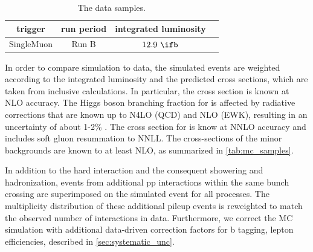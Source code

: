\begin{table}[h!]
\begin{center}
\caption{The data samples.}
\label{tab:data_samples}
\begin{tabular}{cccc}
\hline
trigger & run period & integrated luminosity \\
\hline
SingleMuon & Run B & $12.9~\ifb$ \\
\hline
\hline
\end{tabular}
\end{center}
\end{table}

In order to compare simulation to data, the simulated events are weighted according to the integrated luminosity and the predicted cross sections, which are taken from inclusive calculations. In particular, the \ttH cross section is known at NLO accuracy\cite{Dittmaier:1318996,Beenakker:2001rj,Beenakker:2002nc,Dawson:2002tg,Dawson:2003zu}. The Higgs boson branching fraction for \Hbb is affected by radiative corrections that are known up to N4LO (QCD) and NLO (EWK), resulting in an uncertainty of about 1-2\% \cite{Djouadi:1997yw,Butterworth:2010ym,deFlorian:2016spz}.
The cross section for \ttbar is know at NNLO accuracy and includes soft gluon resummation to NNLL\cite{Czakon:2011xx}. The cross-sections of the minor backgrounds are known to at least NLO, as summarized in \cref{tab:mc_samples}.

In addition to the hard interaction and the consequent showering and hadronization, events from additional pp interactions within the same bunch crossing are superimposed on the simulated event for all processes. The multiplicity distribution of these additional pileup events is reweighted to match the observed number of interactions in data. Furthermore, we correct the MC simulation with additional data-driven correction factors for b tagging, lepton efficiencies, described in \cref{sec:systematic_unc}.


